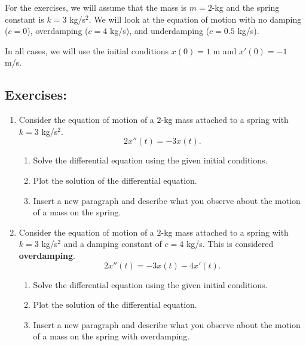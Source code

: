 For the exercises, we will assume that the mass is $m=2$-kg and the spring constant is $k=3$ kg/s$^2$. We will look at the equation of motion with no damping ($c=0$), overdamping ($c=4$ kg/s), and underdamping ($c=0.5$ kg/s).

In all cases, we will use the initial conditions $x(0)=1$ m and $x'(0)=-1$ m/s.

\subsection*{Exercises:}

\begin{enumerate}
\item Consider the equation of motion of a $2$-kg mass attached to a spring with $k=3$ kg/s$^2$.
\label{ex:mass_spring_nodamping}
\[ 2 x''(t) = -3 x(t). \]
\begin{enumerate}
    \item Solve the differential equation using the given initial conditions.
    \item Plot the solution of the differential equation.
    \item Insert a new paragraph and describe what you observe about the motion of a mass on the spring.
\end{enumerate}
\clearpage



\item Consider the equation of motion of a $2$-kg mass attached to a spring with $k=3$ kg/s$^2$ and a damping constant of $c=4$ kg/s. This is considered \textbf{overdamping}.
\[2 x''(t) = -3 x(t) - 4 x'(t).\] 
     \vspace{-.8cm}
\begin{enumerate}
    \item Solve the differential equation using the given initial conditions.
    \item Plot the solution of the differential equation.
    \item Insert a new paragraph and describe what you observe about the motion of a mass on the spring with overdamping.
\end{enumerate}


\end{enumerate}
